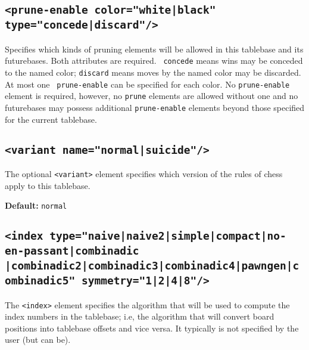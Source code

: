 \documentclass[11pt]{article}
\begin{document}
\subsection{\tt <prune-enable color="white|black" type="concede|discard"/>}

Specifies which kinds of pruning elements will be allowed in this
tablebase and its futurebases.  Both attributes are required.  {\tt
concede} means wins may be conceded to the named color; {\tt discard}
means moves by the named color may be discarded.  At most one {\tt
prune-enable} can be specified for each color.  No {\tt prune-enable}
element is required, however, no {\tt prune} elements are allowed without
one and no futurebases may possess additional {\tt prune-enable}
elements beyond those specified for the current tablebase.


\subsection{\tt <variant name="normal|suicide"/>}

The optional {\tt <variant>} element specifies which version
of the rules of chess apply to this tablebase.

{\bf Default:} {\tt normal}


\subsection{\tt <index type="naive|naive2|simple|compact|no-en-passant|combinadic \hfil\break\hbox{\qquad\qquad\qquad\qquad} |combinadic2|combinadic3|combinadic4|pawngen|combinadic5" \hfil\break\hbox{\qquad} symmetry="1|2|4|8"/>}

The {\tt <index>} element specifies the algorithm that will be used to
compute the index numbers in the tablebase; i.e, the algorithm that
will convert board positions into tablebase offsets and vice versa.
It typically is not specified by the user (but can be).
\end{document}
